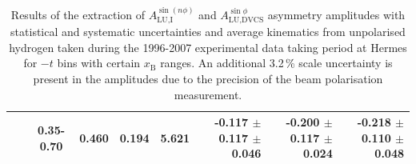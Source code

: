 \begin{table}[width=15cm]
\begin{center}
{\begin{tabular}{|cc|c|c|c|c|r|r|r|}
& & 0.35-0.70 & 0.460  & 0.194 & 5.621  &  -0.117  $\pm$  0.117  $\pm$  0.046 &
 -0.200 $\pm$  0.117  $\pm$  0.024  & -0.218 $\pm$ 0.110 $ \pm$ 0.048 \\
\hline
  \end{tabular}
}
 \end{center}
\caption{Results of the extraction of $A_{\textrm{LU,I}}^{\sin(n\phi)}$ and $A_{\textrm{LU,DVCS}}^{\sin \phi}$ asymmetry amplitudes with statistical and systematic uncertainties and average kinematics from unpolarised hydrogen taken during
the 1996-2007 experimental data taking period at H{\sc ermes} for $-t$ bins with certain $x_{\textrm{B}}$ ranges.
An additional 3.2\,\% scale uncertainty is present in the amplitudes due to the precision of
the beam polarisation measurement.}
\end{table}

